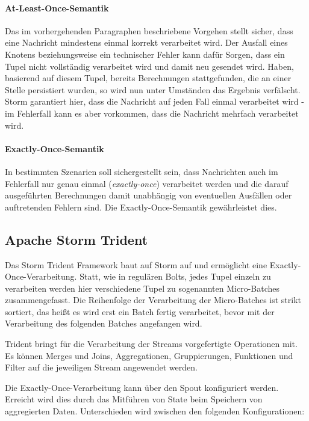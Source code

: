 \documentclass[a4paper,11pt]{scrartcl}
\begin{document}
  \paragraph{At-Least-Once-Semantik}
  Das im vorhergehenden Paragraphen beschriebene Vorgehen stellt
  sicher, dass eine Nachricht mindestens einmal korrekt verarbeitet
  wird. Der Ausfall eines Knotens beziehungsweise ein technischer
  Fehler kann dafür Sorgen, dass ein Tupel nicht vollständig
  verarbeitet wird und damit neu gesendet wird. Haben, basierend auf
  diesem Tupel, bereits Berechnungen stattgefunden, die an einer Stelle
  persistiert wurden, so wird nun unter Umständen das Ergebnis
  verfälscht. Storm garantiert hier, dass die Nachricht auf jeden Fall
  einmal verarbeitet wird - im Fehlerfall kann es aber vorkommen, dass
  die Nachricht mehrfach verarbeitet wird.

  \paragraph{Exactly-Once-Semantik}
  In bestimmten Szenarien soll sichergestellt sein, dass Nachrichten
  auch im Fehlerfall nur genau einmal (\textit{exactly-once})
  verarbeitet werden und die darauf ausgeführten Berechnungen damit
  unabhängig von eventuellen Ausfällen oder auftretenden Fehlern sind.
  Die Exactly-Once-Semantik gewährleistet dies. 

  \subsection{Apache Storm Trident} 
  Das Storm Trident Framework baut auf Storm auf und ermöglicht eine
  Exactly-Once-Verarbeitung. Statt, wie in regulären Bolts, jedes Tupel einzeln
  zu verarbeiten werden hier verschiedene Tupel zu sogenannten Micro-Batches
  zusammengefasst. Die Reihenfolge der Verarbeitung der Micro-Batches ist
  strikt sortiert, das heißt es wird erst ein Batch fertig verarbeitet, bevor
  mit der Verarbeitung des folgenden Batches angefangen
  wird.\cite{stormtrident}

  Trident bringt für die Verarbeitung der Streams vorgefertigte
  Operationen mit. Es können Merges und Joins, Aggregationen,
  Gruppierungen, Funktionen und Filter auf die jeweiligen Stream
  angewendet werden.

  Die Exactly-Once-Verarbeitung kann über den Spout konfiguriert werden.
  Erreicht wird dies durch das Mitführen von State beim Speichern von
  aggregierten Daten.  Unterschieden wird zwischen den
  folgenden Konfigurationen:\cite{stormtridentstate}
\end{document}

